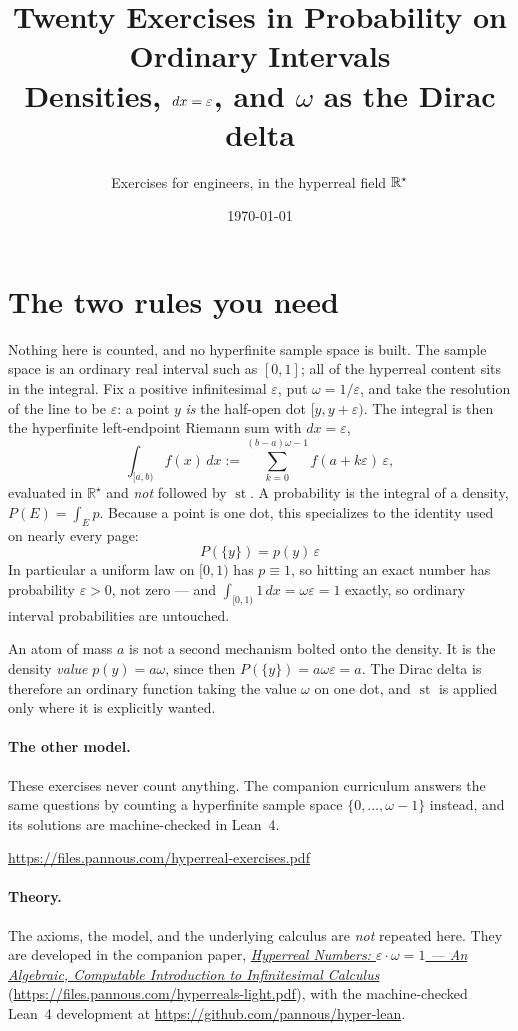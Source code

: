 \documentclass[11pt]{article}
\title{Twenty Exercises in Probability on Ordinary Intervals\\
\large Densities, $dx=\eps$, and $\omega$ as the Dirac delta}
\author{Exercises for engineers, in the hyperreal field $\Rstar$}
\date{\today}
\newcommand{\Rstar}{\mathbb{R}^{\star}}
\newcommand{\eps}{\varepsilon}
\newcommand{\st}{\operatorname{st}}
\begin{document}
\maketitle


\section*{The two rules you need}

Nothing here is counted, and no hyperfinite sample space is built. The sample
space is an ordinary real interval such as $[0,1]$; all of the hyperreal
content sits in the integral. Fix a positive infinitesimal $\eps$, put
$\omega = 1/\eps$, and take the resolution of the line to be $\eps$: a point
$y$ \emph{is} the half-open dot $[y, y+\eps)$. The integral is then the
hyperfinite left-endpoint Riemann sum with $dx = \eps$,
\[
  \int_{[a,b)} f(x)\,dx
  := \sum_{k=0}^{(b-a)\omega-1} f(a+k\eps)\,\eps ,
\]
evaluated in $\Rstar$ and \emph{not} followed by $\st$. A probability is the
integral of a density, $P(E)=\int_E p$. Because a point is one dot, this
specializes to the identity used on nearly every page:
\[
  \boxed{\;P(\{y\}) = p(y)\,\eps\;}
\]
In particular a uniform law on $[0,1)$ has $p \equiv 1$, so hitting an exact
number has probability $\eps > 0$, not zero --- and $\int_{[0,1)} 1\,dx
= \omega\eps = 1$ exactly, so ordinary interval probabilities are untouched.

An atom of mass $a$ is not a second mechanism bolted onto the density. It is
the density \emph{value} $p(y)=a\omega$, since then $P(\{y\})=a\omega\eps=a$.
The Dirac delta is therefore an ordinary function taking the value $\omega$ on
one dot, and $\st$ is applied only where it is explicitly wanted.

\paragraph{The other model.} These exercises never count anything. The
companion curriculum answers the same questions by counting a hyperfinite
sample space $\{0,\dots,\omega-1\}$ instead, and its solutions are
machine-checked in Lean~4.
\begin{center}\small\url{https://files.pannous.com/hyperreal-exercises.pdf}\end{center}

\paragraph{Theory.} The axioms, the model, and the underlying calculus are
\emph{not} repeated here. They are developed in the companion paper,
\href{https://files.pannous.com/hyperreals-light.pdf}{\emph{Hyperreal Numbers: $\eps\cdot\omega=1$ --- An
Algebraic, Computable Introduction to Infinitesimal Calculus}}
(\url{https://files.pannous.com/hyperreals-light.pdf}), with the machine-checked Lean~4 development at
\url{https://github.com/pannous/hyper-lean}.
\end{document}

